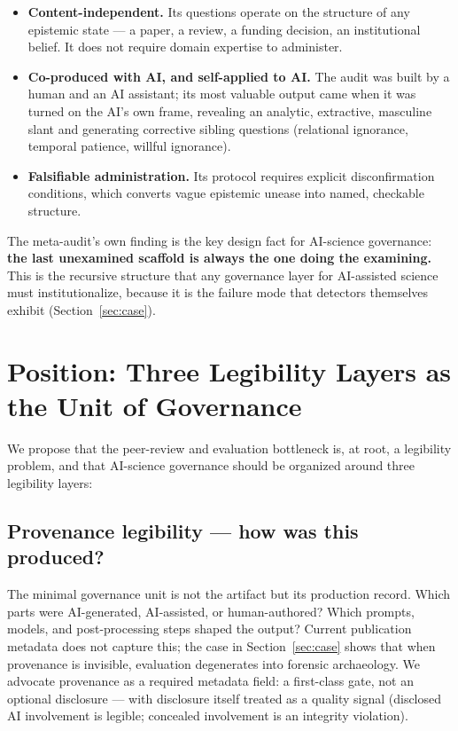 \documentclass{article}
\begin{document}
\begin{itemize}
\item \textbf{Content-independent.} Its questions operate on the structure of any epistemic state --- a paper, a review, a funding decision, an institutional belief. It does not require domain expertise to administer.
\item \textbf{Co-produced with AI, and self-applied to AI.} The audit was built by a human and an AI assistant; its most valuable output came when it was turned on the AI's own frame, revealing an analytic, extractive, masculine slant and generating corrective sibling questions (relational ignorance, temporal patience, willful ignorance).
\item \textbf{Falsifiable administration.} Its protocol requires explicit disconfirmation conditions, which converts vague epistemic unease into named, checkable structure.
\end{itemize}

The meta-audit's own finding is the key design fact for AI-science governance: \textbf{the last unexamined scaffold is always the one doing the examining.} This is the recursive structure that any governance layer for AI-assisted science must institutionalize, because it is the failure mode that detectors themselves exhibit (Section~\ref{sec:case}).

\section{Position: Three Legibility Layers as the Unit of Governance}
\label{sec:position}

We propose that the peer-review and evaluation bottleneck is, at root, a legibility problem, and that AI-science governance should be organized around three legibility layers:

\subsection{Provenance legibility --- how was this produced?}
The minimal governance unit is not the artifact but its production record. Which parts were AI-generated, AI-assisted, or human-authored? Which prompts, models, and post-processing steps shaped the output? Current publication metadata does not capture this; the case in Section~\ref{sec:case} shows that when provenance is invisible, evaluation degenerates into forensic archaeology. We advocate provenance as a required metadata field: a first-class gate, not an optional disclosure --- with disclosure itself treated as a quality signal (disclosed AI involvement is legible; concealed involvement is an integrity violation).
\end{document}

